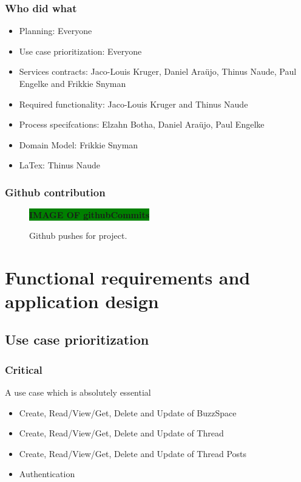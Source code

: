 \documentclass [a4paper,12pt] {article}
\begin{document}
		\subsubsection{Who did what}
			\begin{itemize}
				\item Planning: Everyone
				\item Use case prioritization: Everyone
				\item Services contracts: Jaco-Louis Kruger, Daniel Araüjo, Thinus Naude, Paul Engelke and Frikkie Snyman
				\item Required functionality: Jaco-Louis Kruger and Thinus Naude
				\item Process specifcations: Elzahn Botha, Daniel Araüjo, Paul Engelke
				\item Domain Model: Frikkie Snyman
				\item LaTex: Thinus Naude
			\end{itemize}
		\pagebreak
		\subsubsection{Github contribution}
		\begin{figure}[!htbp]
			\centering
			\large\textbf{\colorbox{green}{IMAGE OF githubCommits}}
			\caption{Github pushes for project.}
		\end{figure}
\pagebreak
\section{Functional requirements and application design}
	\subsection{Use case prioritization}
	\subsubsection{Critical}A use case which is absolutely essential
	\begin{itemize}
		\item Create, Read/View/Get, Delete and Update of BuzzSpace
		\item Create, Read/View/Get, Delete and Update of Thread
		\item Create, Read/View/Get, Delete and Update of Thread Posts
		\item Authentication	
	\end{itemize}
\end{document}
